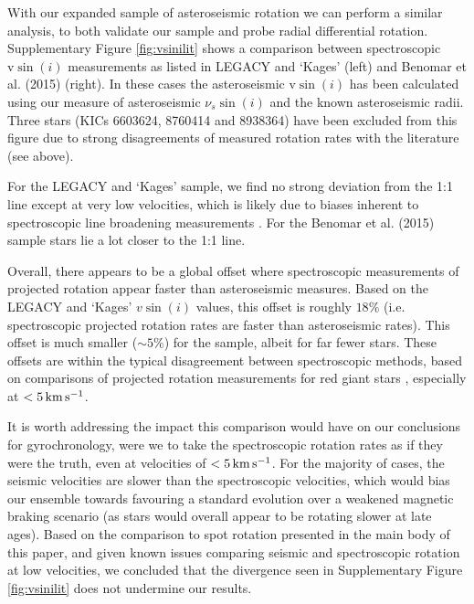 With our expanded sample of asteroseismic rotation we can perform a similar analysis, to both validate our sample and probe radial differential rotation.  Supplementary Figure \ref{fig:vsinilit} shows a comparison between spectroscopic $\textrm{v}\sin(i)$ measurements as listed in LEGACY and `Kages' (left) and Benomar et al. (2015) \cite{benomar+2015} (right). In these cases the asteroseismic $\textrm{v}\sin(i)$ has been calculated using our measure of asteroseismic $\nu_s\sin(i)$ and the known asteroseismic radii. Three stars (KICs 6603624, 8760414 and 8938364) have been excluded from this figure due to strong disagreements of measured rotation rates with the literature (see above).

For the LEGACY and `Kages' sample, we find no strong deviation from the 1:1 line except at very low velocities, which is likely due to biases inherent to spectroscopic line broadening measurements \cite{doyle+2014, tayar+2015}. For the Benomar et al. (2015) sample stars lie a lot closer to the 1:1 line.

Overall, there appears to be a global offset where spectroscopic measurements of projected rotation appear faster than asteroseismic measures. Based on the LEGACY and `Kages' $v\sin(i)$ values, this offset is roughly $18\%$ (i.e. spectroscopic projected rotation rates are faster than asteroseismic rates). This offset is much smaller ($\sim5\%$) for the \cite{benomar+2015} sample, albeit for far fewer stars. These offsets are within the typical disagreement between spectroscopic methods, based on comparisons of projected rotation measurements for red giant stars \cite[see Figure 2]{tayar+2015}, especially at $< 5\, \rm{km\,s^{-1}}$.

It is worth addressing the impact this comparison would have on our conclusions for gyrochronology, were we to take the spectroscopic rotation rates as if they were the truth, even at velocities of $< 5\, \rm{km\,s^{-1}}$. For the majority of cases, the seismic velocities are slower than the spectroscopic velocities, which would bias our ensemble towards favouring a standard evolution over a weakened magnetic braking scenario (as stars would overall appear to be rotating slower at late ages). Based on the comparison to spot rotation presented in the main body of this paper, and given known issues comparing seismic and spectroscopic rotation at low velocities, we concluded that the divergence seen in  Supplementary Figure \ref{fig:vsinilit} does not undermine our results.


